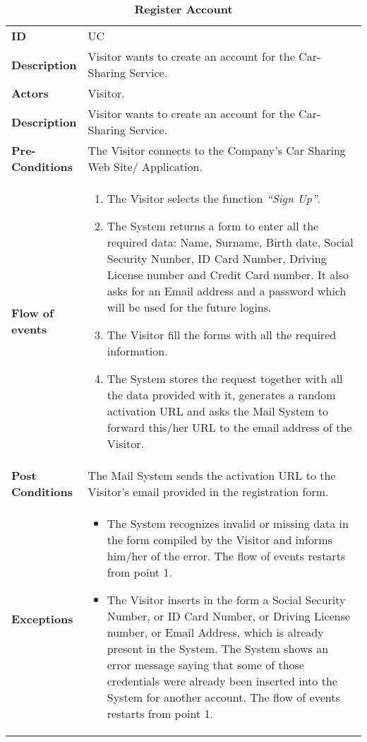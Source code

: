 

\begin{longtable}{|p{0.2\linewidth} p{0.8\linewidth}|}
	\captionsetup{labelformat=empty} %
	\caption{\textbf{Register Account}} %
	\label{UC_Register}%
	\\ \hline %
	
	\textbf{ID} & UC\theUseCaseIdCounter \\ \hline
	\textbf{Description} & Visitor wants to create an account for the Car-Sharing Service. \\ \hline
	\textbf{Actors} & Visitor.\\ \hline
	\textbf{Description} & Visitor wants to create an account for the Car-Sharing Service. \\ \hline
	\textbf{Pre-Conditions} & The Visitor connects to the Company's Car Sharing Web Site/ Application. \\ \hline
	\textbf{Flow of events} & 
		\begin{enumerate}
			\item The Visitor selects the function \textit{\textquotedblleft{Sign Up}\textquotedblright}.
			\item The System returns a form to enter all the required data: Name, Surname, Birth date, Social Security Number, ID Card Number, Driving License number and Credit Card number. It also asks for an Email address and a password which will be used for the future logins.
			\item The Visitor fill the forms with all the required information.
			\item The System stores the request together with all the data provided with it, generates a random activation URL and asks the Mail System to forward this/her URL to the email address of the Visitor.
		\end{enumerate}	 \\ \hline
	\textbf{Post Conditions} & The Mail System sends the activation URL to the Visitor's email provided in the registration form. \\ \hline
	\textbf{Exceptions} & 
		\begin{itemize}
		\item The System recognizes invalid or missing data in the form compiled by the Visitor and informs him/her of the error. The flow of events restarts from point 1.
		\item The Visitor inserts in the form a Social Security Number, or ID Card Number, or Driving License number, or Email Address, which is already present in the System. The System shows an error message saying that some of those credentials were already been inserted into the System for another account. The flow of events restarts from point 1.
		\end{itemize} \\ \hline
\end{longtable}


